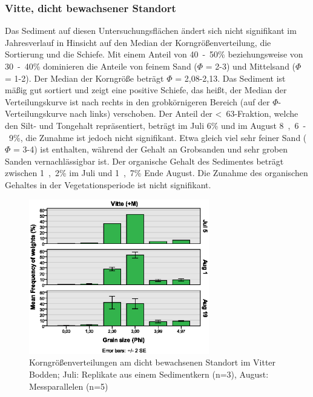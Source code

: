 \subsubsection{Vitte, dicht bewachsener Standort}

Das Sediment auf diesen Untersuchungsflächen ändert sich nicht signifikant im Jahresverlauf in Hinsicht auf den Median der Korngrößenverteilung, die Sortierung und die Schiefe. Mit einem Anteil von \unit{40-50}{\%} beziehungsweise von \unit{30-40}{\%} dominieren die Anteile von feinem Sand ($\Phi$ = 2-3) und Mittelsand ($\Phi$ = 1-2). Der Median der Korngröße beträgt $\Phi$ = 2,08-2,13. Das Sediment ist mäßig gut sortiert und zeigt eine positive Schiefe, das heißt, der Median der Verteilungskurve ist nach rechts in den grobkörnigeren Bereich (auf der $\Phi$- Verteilungskurve nach links) verschoben. Der Anteil der \unit{< 63}{\mu\metre}-Fraktion, welche den Silt- und Tongehalt repräsentiert, beträgt im Juli \unit{6}{\%} und im August \unit{8,6-9}{\%}, die Zunahme ist jedoch nicht signifikant. Etwa gleich viel sehr feiner Sand ($\Phi$ = 3-4) ist enthalten, während der Gehalt an Grobsanden und sehr groben Sanden vernachlässigbar ist. Der organische Gehalt des Sedimentes beträgt zwischen \unit{1,2}{\%} im Juli und \unit{1,7}{\%} Ende August. Die Zunahme des organischen Gehaltes in der Vegetationsperiode ist nicht signifikant.

\begin{figure}[!htb]
\centering
\includegraphics[width=0.70\textwidth]{images/grainsize/sediment_im_jahr1.eps}
\caption[Korngrößenverteilungen Vitte (+M)]{Korngrößenverteilungen am dicht bewachsenen Standort im Vitter Bodden; Juli: Replikate aus einem Sedimentkern (n=3), August: Messparallelen (n=5)}
\label{fig:korngrössen_Vitte_+m}
\end{figure}



